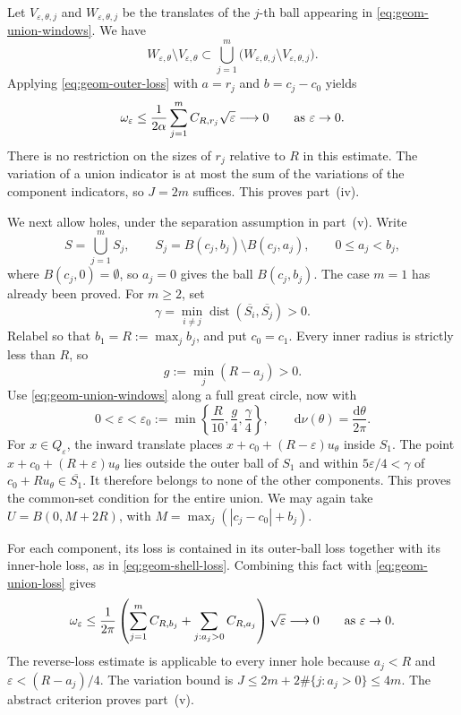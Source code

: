 \documentclass[12pt,reqno,tbtags]{amsart}
\def\d{\mathrm{d}}
\newcommand\1{\mathbbm{1}}
\newcommand{\eps}{\varepsilon}
\def\d{\mathrm{d}}
\begin{document}
Let $V_{\eps,\theta,j}$ and $W_{\eps,\theta,j}$ be the translates of the
$j$-th ball appearing in \eqref{eq:geom-union-windows}. We have
\begin{equation}\label{eq:geom-union-loss}
    W_{\eps,\theta}\setminus V_{\eps,\theta}
    \subset
    \bigcup_{j=1}^{m}
    \bigl(W_{\eps,\theta,j}\setminus V_{\eps,\theta,j}\bigr).
\end{equation}
Applying \eqref{eq:geom-outer-loss} with $a=r_j$ and $b=c_j-c_0$ yields
\begin{equation*}
    \omega_\eps
    \le\frac1{2\alpha}\sum_{j=1}^{m}C_{R,r_j}\sqrt{\eps}
    \longrightarrow0\qquad{\rm{as}}\ \eps\to0.
\end{equation*}
There is no restriction on the sizes of $r_j$ relative to $R$ in this estimate.
The variation of a union indicator is at most the sum of the variations of
the component indicators, so $J=2m$ suffices. This proves part~(iv).

We next allow holes, under the separation assumption in part~(v). Write
\begin{equation*}
    S=\bigcup_{j=1}^{m}S_j,\qquad
    S_j=B(c_j,b_j)\setminus B(c_j,a_j),\qquad 0\le a_j<b_j,
\end{equation*}
where $B(c_j,0)=\emptyset$, so $a_j=0$ gives the ball $B(c_j,b_j)$.
The case $m=1$ has already been proved. For $m\ge2$, set
\begin{equation*}
    \gamma=\min_{i\ne j}\operatorname{dist}
       (\overline{S_i},\overline{S_j})>0.
\end{equation*}
Relabel so that $b_1=R:=\max_j b_j$, and put $c_0=c_1$.
Every inner radius is strictly less than $R$, so
\begin{equation*}
    g:=\min_j(R-a_j)>0.
\end{equation*}
Use \eqref{eq:geom-union-windows} along a full great circle, now with
\begin{equation*}
    0<\eps<\eps_0:=\min\left\{\frac R{10},\frac g4,\frac\gamma4\right\},
    \qquad \d\nu(\theta)=\frac{\d\theta}{2\pi}.
\end{equation*}
For $x\in Q_\eps$, the inward translate places
$x+c_0+(R-\eps)u_\theta$ inside $S_1$.
The point $x+c_0+(R+\eps)u_\theta$ lies outside the outer ball of $S_1$
and within $5\eps/4<\gamma$ of $c_0+Ru_\theta\in\overline{S_1}$.
It therefore belongs to none of the other components.
This proves the common-set condition for the entire union.
We may again take $U=B(0,M+2R)$, with
$M=\max_j(|c_j-c_0|+b_j)$.

For each component, its loss is contained in its outer-ball loss together
with its inner-hole loss, as in \eqref{eq:geom-shell-loss}.
Combining this fact with \eqref{eq:geom-union-loss} gives
\begin{equation*}
    \omega_\eps
    \le\frac1{2\pi}\left(
        \sum_{j=1}^{m}C_{R,b_j}
        +\sum_{j:a_j>0}C_{R,a_j}\right)\sqrt{\eps}
    \longrightarrow0\qquad{\rm{as}}\ \eps\to0.
\end{equation*}
The reverse-loss estimate is applicable to every inner hole because
$a_j<R$ and $\eps<(R-a_j)/4$. The variation bound is
$J\le2m+2\#\{j:a_j>0\}\le4m$.
The abstract criterion proves part~(v).
\end{document}

